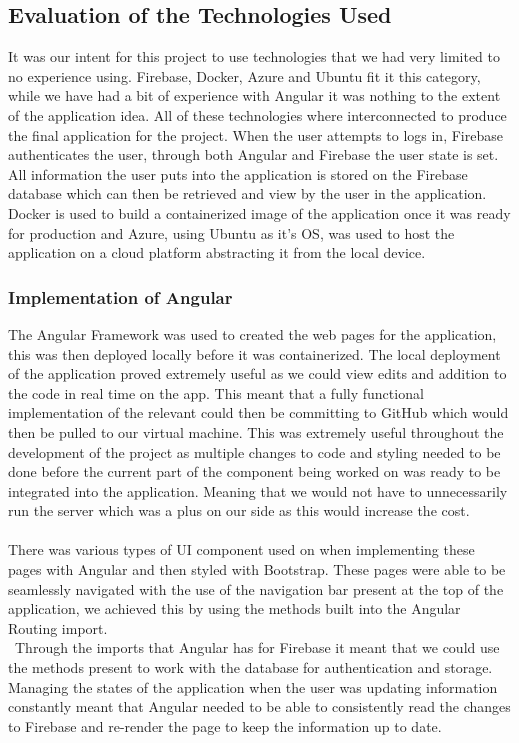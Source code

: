 \subsection{Evaluation of the Technologies Used}
It was our intent for this project to use technologies that we had very limited to no experience using.  Firebase, Docker, Azure and Ubuntu fit it this category, while we have had a bit of experience with Angular it was nothing to the extent of the application idea. All of these technologies where interconnected to produce the final application for the project.  When the user attempts to logs in, Firebase authenticates the user, through both Angular and Firebase the user state is set.  All information the user puts into the application is stored on the Firebase database which can then be retrieved and view by the user in the application.  Docker is used to build a containerized image of the application once it was ready for production and Azure, using Ubuntu as it's OS, was used to host the application on a cloud platform abstracting it from the local device.

\subsubsection{Implementation of Angular}
The Angular Framework was used to created the web pages for the application, this was then deployed locally before it was containerized. The local deployment of the application proved extremely useful as we could view edits and addition to the code in real time on the app. This meant that a fully functional implementation of the relevant could then be committing to GitHub which would then be pulled to our virtual machine. This was extremely useful throughout the development of the project as multiple changes to code and styling needed to be done before the current part of the component being worked on was ready to be integrated into the application.  Meaning that we would not have to unnecessarily run the server which was a plus on our side as this would increase the cost.  \\\\
There was various types of UI component used on when implementing these pages with Angular and then styled with Bootstrap.  These pages were able to be seamlessly navigated with the use of the navigation bar present at the top of the application, we achieved this by using the methods built into the Angular Routing import.  \\\
Through the imports that Angular has for Firebase it meant that we could use the methods present to work with the database for authentication and storage.  Managing the states of the application when the user was updating information constantly meant that Angular needed to be able to consistently read the changes to Firebase and re-render the page to keep the information up to date.

